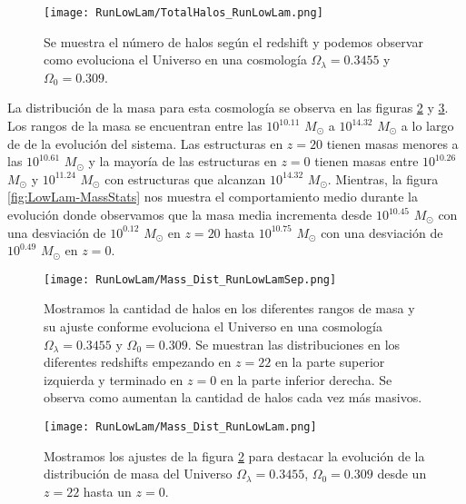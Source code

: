 \begin{figure}[H]
    \centering
    \texttt{[image: RunLowLam/TotalHalos\_RunLowLam.png]}
    \caption[Evolución del número de halos en un Universo $\Omega_\lambda = 0.3455$, $\Omega_0 = 0.309$]{\footnotesize Se muestra el número de halos según el redshift y podemos observar como evoluciona el Universo en una cosmología $\Omega_\lambda = 0.3455 $ y $\Omega_0 = 0.309$.}
    \label{fig:LowLam_TotalHalos}
\end{figure}

La distribución de la masa para esta cosmología se observa en las figuras \ref{fig:LowLam-MassDistSep} y \ref{fig:LowLam-MassDist}. Los rangos de la masa se encuentran entre las $10^{10.11}$ $M_\odot$ a $10^{14.32}$ $M_\odot$ a lo largo de de la evolución del sistema. Las estructuras en $z=20$ tienen masas menores a las $10^{10.61}$ $M_\odot$ y la mayoría de las estructuras en $z=0$ tienen masas entre $10^{10.26}$ $M_\odot$ y $10^{11.24}$ $M_\odot$ con estructuras que alcanzan $10^{14.32}$ $M_\odot$. Mientras, la figura \ref{fig:LowLam-MassStats} nos muestra el comportamiento medio durante la evolución donde observamos que la masa media incrementa desde $10^{10.45}$ $M_\odot$ con una desviación de $10^{0.12}$ $M_\odot$ en $z=20$ hasta $10^{10.75}$ $M_\odot$ con una desviación de $10^{0.49}$ $M_\odot$ en $z=0$.

\begin{figure}[H]
    \centering
    \texttt{[image: RunLowLam/Mass\_Dist\_RunLowLamSep.png]}
    \caption[Distribución de masa]{\footnotesize Mostramos la cantidad de halos en los diferentes rangos de masa y su ajuste conforme evoluciona el Universo en una cosmología $\Omega_\lambda = 0.3455$ y $\Omega_0 = 0.309$. Se muestran las distribuciones en los diferentes redshifts empezando en $z=22$ en la parte superior izquierda y terminado en $z=0$ en la parte inferior derecha. Se observa como aumentan la cantidad de halos cada vez más masivos.}
    \label{fig:LowLam-MassDistSep}
\end{figure}

\begin{figure}[H]
    \centering
    \texttt{[image: RunLowLam/Mass\_Dist\_RunLowLam.png]}
    \caption[Comparación de distribución de masa]{\footnotesize Mostramos los ajustes de la figura \ref{fig:LowLam-MassDistSep} para destacar la evolución de la distribución de masa del Universo $\Omega_\lambda = 0.3455$, $\Omega_0 = 0.309$ desde un $z=22$ hasta un $z=0$.}
    \label{fig:LowLam-MassDist}
\end{figure}

